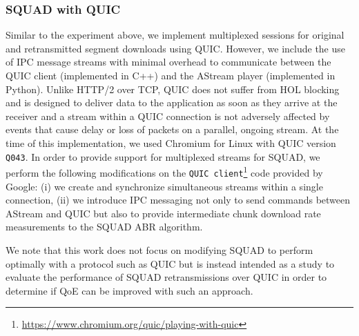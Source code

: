 \subsubsection{SQUAD with QUIC}
Similar to the experiment above, we implement multiplexed sessions for original and retransmitted segment downloads using QUIC. However, we include the use of IPC message streams with minimal overhead to communicate between the QUIC client (implemented in C++) and the AStream player (implemented in Python). Unlike HTTP/2 over TCP, QUIC does not suffer from HOL blocking and is designed to deliver data to the application as soon as they arrive at the receiver and a stream within a QUIC connection is not adversely affected by events that cause delay or loss of packets on a parallel, ongoing stream. At the time of this implementation, we used Chromium for Linux with QUIC version \texttt{Q043}. In order to provide support for multiplexed streams for SQUAD, we perform the following modifications on the \texttt{QUIC client}\footnote{\url{https://www.chromium.org/quic/playing-with-quic}} code provided by Google: (i) we create and synchronize simultaneous streams within a single connection, (ii) we introduce IPC messaging not only to send commands between AStream and QUIC but also to provide intermediate chunk download rate measurements to the SQUAD ABR algorithm.

We note that this work does not focus on modifying SQUAD to perform optimally with a protocol such as QUIC but is instead intended as a study to evaluate  the performance of SQUAD retransmissions over QUIC in order to determine if QoE can be improved with such an approach.